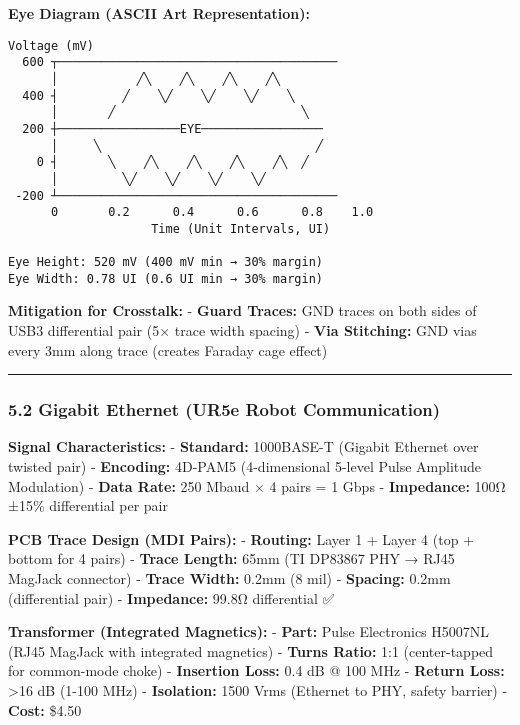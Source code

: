 \documentclass[
]{article}
\begin{document}
\textbf{Eye Diagram (ASCII Art Representation):}

\begin{verbatim}
Voltage (mV)
  600 ┬───────────────────────────────────────
      │           ╱╲    ╱╲    ╱╲    ╱╲
  400 ┤         ╱    ╲╱    ╲╱    ╲╱    ╲
      │       ╱                          ╲
  200 ┼─────────────────EYE─────────────────
      │     ╲                              ╱
    0 ┤       ╲    ╱╲    ╱╲    ╱╲    ╱╲  ╱
      │         ╲╱    ╲╱    ╲╱    ╲╱
 -200 ┴───────────────────────────────────────
      0       0.2      0.4      0.6      0.8    1.0
                    Time (Unit Intervals, UI)

Eye Height: 520 mV (400 mV min → 30% margin)
Eye Width: 0.78 UI (0.6 UI min → 30% margin)
\end{verbatim}

\textbf{Mitigation for Crosstalk:} - \textbf{Guard Traces:} GND traces
on both sides of USB3 differential pair (5× trace width spacing) -
\textbf{Via Stitching:} GND vias every 3mm along trace (creates Faraday
cage effect)

\begin{center}\rule{0.5\linewidth}{0.5pt}\end{center}

\hypertarget{gigabit-ethernet-ur5e-robot-communication}{%
\subsubsection{5.2 Gigabit Ethernet (UR5e Robot
Communication)}\label{gigabit-ethernet-ur5e-robot-communication}}

\textbf{Signal Characteristics:} - \textbf{Standard:} 1000BASE-T
(Gigabit Ethernet over twisted pair) - \textbf{Encoding:} 4D-PAM5
(4-dimensional 5-level Pulse Amplitude Modulation) - \textbf{Data Rate:}
250 Mbaud × 4 pairs = 1 Gbps - \textbf{Impedance:} 100Ω ±15\%
differential per pair

\textbf{PCB Trace Design (MDI Pairs):} - \textbf{Routing:} Layer 1 +
Layer 4 (top + bottom for 4 pairs) - \textbf{Trace Length:} 65mm (TI
DP83867 PHY → RJ45 MagJack connector) - \textbf{Trace Width:} 0.2mm (8
mil) - \textbf{Spacing:} 0.2mm (differential pair) - \textbf{Impedance:}
99.8Ω differential ✅

\textbf{Transformer (Integrated Magnetics):} - \textbf{Part:} Pulse
Electronics H5007NL (RJ45 MagJack with integrated magnetics) -
\textbf{Turns Ratio:} 1:1 (center-tapped for common-mode choke) -
\textbf{Insertion Loss:} 0.4 dB @ 100 MHz - \textbf{Return Loss:}
\textgreater16 dB (1-100 MHz) - \textbf{Isolation:} 1500 Vrms (Ethernet
to PHY, safety barrier) - \textbf{Cost:} \$4.50
\end{document}
